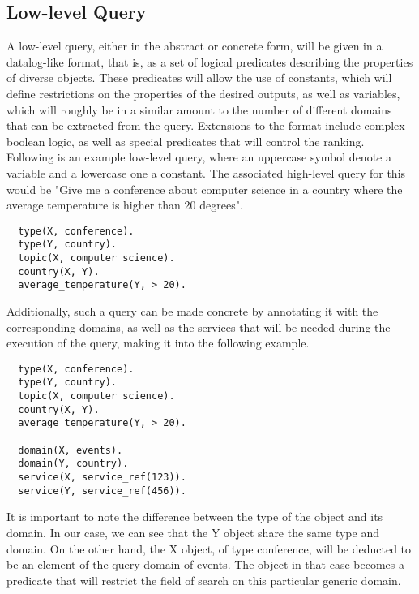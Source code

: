 
\subsection{Low-level Query} %
\label{sub:low_level_query}

A low-level query, either in the abstract or concrete form, will be given in a datalog-like format, that is, as a set of logical predicates describing the properties of diverse objects. These predicates will allow the use of constants, which will define restrictions on the properties of the desired outputs, as well as variables, which will roughly be in a similar amount to the number of different domains that can be extracted from the query. Extensions to the format include complex boolean logic, as well as special predicates that will control the ranking.  Following is an example low-level query, where an uppercase symbol denote a variable and a lowercase one a constant. The associated high-level query for this would be "Give me a conference about computer science in a country where the average temperature is higher than 20 degrees".

\begin{verbatim}
  type(X, conference).
  type(Y, country).
  topic(X, computer science).
  country(X, Y).
  average_temperature(Y, > 20).
\end{verbatim}

Additionally, such a query can be made concrete by annotating it with the corresponding domains, as well as the services that will be needed during the execution of the query, making it into the following example.

\begin{verbatim}
  type(X, conference).
  type(Y, country).
  topic(X, computer science).
  country(X, Y).
  average_temperature(Y, > 20).
  
  domain(X, events).
  domain(Y, country).
  service(X, service_ref(123)).
  service(Y, service_ref(456)).
\end{verbatim}

It is important to note the difference between the type of the object and its domain. In our case, we can see that the Y object share the same type and domain. On the other hand, the X object, of type conference, will be deducted to be an element of the query domain of events. The object in that case becomes a predicate that will restrict the field of search on this particular generic domain.

